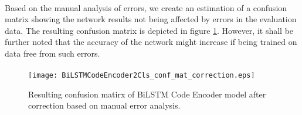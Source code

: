 \paragraph{}
Based on the manual analysis of errors, we create an estimation of a confusion matrix showing the network results not being affected by errors in the evaluation data. The resulting confusion matrix is depicted in figure \ref{bi_lstm_code_encoder_2cls_conf_mat_correction}. However, it shall be further noted that the accuracy of the network might increase if being trained on data free from such errors.


\paragraph{}
\begin{figure}[!h]
	\texttt{[image: BiLSTMCodeEncoder2Cls\_conf\_mat\_correction.eps]}
	\centering
	\caption{Resulting confusion matirx of BiLSTM Code Encoder model after correction based on manual error analysis.}
	\label{bi_lstm_code_encoder_2cls_conf_mat_correction}
\end{figure}

